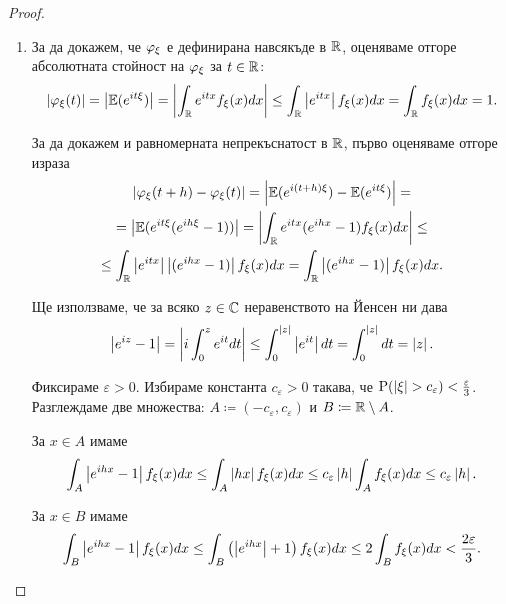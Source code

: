 \documentclass[numbers=endperiod, DIV=15, bibliography=totocnumbered]{scrartcl}
\begin{document}
\begin{proof}
  \mbox{}
  \begin{enumerate}
    \item За да докажем, че $\varphi_\xi$ е дефинирана навсякъде в $\mathbb{R}$, оценяваме отгоре абсолютната стойност на $\varphi_\xi$ за $t \in \mathbb{R}$:
    \begin{displaymath}
      \left\vert \varphi_\xi(t) \right\vert
      =
      \left\vert \mathbb{E}(e^{it\xi}) \right\vert
      =
      \left\vert \int_{\mathbb{R}} e^{itx} f_\xi(x) dx \right\vert
      \leq
      \int_{\mathbb{R}} \left\vert e^{itx} \right\vert f_\xi(x) dx
      =
      \int_{\mathbb{R}} f_\xi(x) dx
      =
      1.
    \end{displaymath}

    За да докажем и равномерната непрекъснатост в $\mathbb{R}$, първо оценяваме отгоре израза
    \begin{multline*}
      \left\vert \varphi_\xi(t + h) - \varphi_\xi(t) \right\vert
      =
      \left\vert \mathbb{E}(e^{i(t + h)\xi}) - \mathbb{E}(e^{it\xi}) \right\vert
      = \\ =
      \left\vert \mathbb{E}(e^{it\xi} (e^{ih\xi} - 1)) \right\vert
      =
      \left\vert \int_{\mathbb{R}} e^{itx} (e^{ihx} - 1) f_\xi(x) dx \right\vert
      \leq \\ \leq
      \int_{\mathbb{R}} \left\vert e^{itx} \right\vert \left\vert (e^{ihx} - 1) \right\vert f_\xi(x) dx
      =
      \int_{\mathbb{R}} \left\vert (e^{ihx} - 1) \right\vert f_\xi(x) dx.
    \end{multline*}

    Ще използваме, че за всяко $z \in \mathbb{C}$ неравенството на Йенсен ни дава
    \begin{displaymath}
      \left\vert e^{iz} - 1 \right\vert
      =
      \left\vert i \int_0^z e^{it} dt \right\vert
      \leq
      \int_0^{\left\vert z \right\vert} \left\vert e^{it} \right\vert dt
      =
      \int_0^{\left\vert z \right\vert} dt
      =
      \left\vert z \right\vert.
    \end{displaymath}

    Фиксираме $\varepsilon > 0$. Избираме константа $c_\varepsilon > 0$ такава, че $\operatorname{P}(\left\vert \xi \right\vert > c_\varepsilon) < \frac \varepsilon 3$.
    Разглеждаме две множества: $A \coloneqq (-c_\varepsilon, c_\varepsilon)$ и $B \coloneqq \mathbb{R} \setminus A$.

    За $x \in A$ имаме
    \begin{displaymath}
      \int_A \left\vert e^{ihx} - 1 \right\vert f_\xi(x) dx
      \leq
      \int_A \left\vert h x \right\vert f_\xi(x) dx
      \leq
      c_\varepsilon \left\vert h \right\vert \int_A f_\xi(x) dx
      \leq
      c_\varepsilon \left\vert h \right\vert.
    \end{displaymath}

    За $x \in B$ имаме
    \begin{displaymath}
      \int_B \left\vert e^{ihx} - 1 \right\vert f_\xi(x) dx
      \leq
      \int_B \left( \left\vert e^{ihx} \right\vert + 1 \right) f_\xi(x) dx
      \leq
      2 \int_B f_\xi(x) dx
      <
      \frac {2\varepsilon} 3.
    \end{displaymath}


\end{enumerate}
\end{proof}
\end{document}
